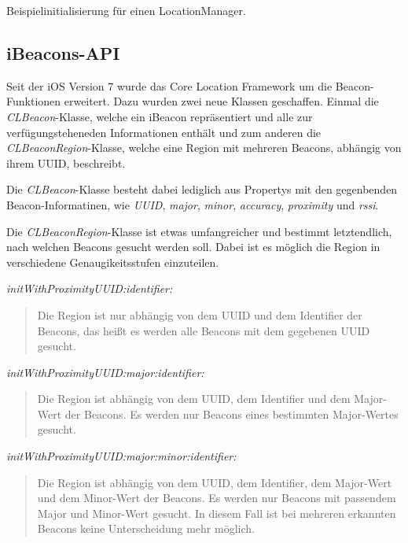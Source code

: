   \begin{listing}[htb!]
    \caption{Beispielinitialisierung für einen LocationManager.}
    \label{lst:locationmanager_objc}
  \end{listing}

\subsection{iBeacons-API}
\label{sec:technologies:corelocation:ibeaconsapi}
Seit der iOS Version 7 wurde das Core Location Framework um die Beacon-Funktionen erweitert. 
Dazu wurden zwei neue Klassen geschaffen. Einmal die \emph{CLBeacon}-Klasse, welche ein iBeacon repräsentiert und alle zur verfügungsteheneden Informationen enthält und zum anderen die \emph{CLBeaconRegion}-Klasse, welche eine Region mit mehreren Beacons, abhängig von ihrem UUID, beschreibt.

Die \emph{CLBeacon}-Klasse besteht dabei lediglich aus Propertys mit den gegenbenden Beacon-Informatinen, wie \emph{UUID}, \emph{major}, \emph{minor}, \emph{accuracy}, \emph{proximity} und \emph{rssi}.

Die \emph{CLBeaconRegion}-Klasse ist etwas umfangreicher und bestimmt letztendlich, nach welchen Beacons gesucht werden soll.
Dabei ist es möglich die Region in verschiedene Genaugikeitsstufen einzuteilen.


\emph{initWithProximityUUID:identifier:}\begin{quote}
	Die Region ist nur abhängig von dem UUID und dem Identifier der Beacons, das heißt es werden alle Beacons mit dem gegebenen UUID gesucht.
\end{quote}
\emph{initWithProximityUUID:major:identifier:}\begin{quote}
	Die Region ist abhängig von dem UUID, dem Identifier und dem Major-Wert der Beacons. Es werden nur Beacons eines bestimmten Major-Wertes gesucht.
\end{quote}
\emph{initWithProximityUUID:major:minor:identifier:}\begin{quote}
	Die Region ist abhängig von dem UUID, dem Identifier, dem Major-Wert und dem Minor-Wert der Beacons. Es werden nur Beacons mit passendem Major und Minor-Wert gesucht. In diesem Fall ist bei mehreren erkannten Beacons keine Unterscheidung mehr möglich.
\end{quote}


